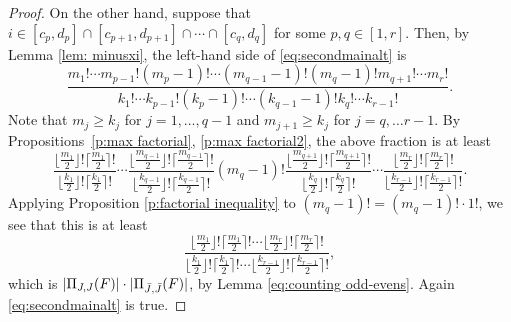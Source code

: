 \documentclass[12pt]{amsart}
\theoremstyle{definition}
\numberwithin{equation}{section}
\begin{document}
\begin{proof}
On the other hand, suppose that $i \in [c_p,d_p] \cap [c_{p+1},d_{p+1}] \cap \cdots \cap [c_q,d_q]$ for some $p ,q \in [1,r]$. Then, by Lemma \ref{lem: minusxi}, the left-hand side of \eqref{eq:secondmainalt} is \begin{equation*}
     \frac{m_1! \cdots m_{p-1}! (m_{p} -1)! \cdots (m_{q-1}-1)! (m_q -1)! m_{q+1}! \cdots m_r!}{k_1! \cdots k_{p-1}! (k_p -1)! \cdots (k_{q-1} -1)! k_q! \cdots k_{r-1}!}.
\end{equation*}
Note that $m_{j} \geq k_{j}$ for $j=1, \dotsc, q-1$ and $m_{j+1} \geq k_{j}$ for $j=q, \dotsc r-1$. By Propositions~\ref{p:max factorial}, \ref{p:max factorial2}, the above fraction is at least
\begin{equation*}
    \frac{\lfloor \frac{m_1}{2}\rfloor!\lceil \frac{m_1}{2}\rceil!}{\lfloor \frac{k_1}{2}\rfloor!\lceil \frac{k_1}{2}\rceil!} \cdots
    \frac{\lfloor \frac{m_{q-1}}{2}\rfloor!\lceil \frac{m_{q-1}}{2}\rceil!}{\lfloor \frac{k_{q-1}}{2}\rfloor!\lceil \frac{k_{q-1}}{2}\rceil!} (m_q -1)!
    \frac{\lfloor \frac{m_{q+1}}{2}\rfloor!\lceil \frac{m_{q+1}}{2}\rceil!}{\lfloor \frac{k_{q}}{2}\rfloor!\lceil \frac{k_{q}}{2}\rceil!} \cdots
    \frac{\lfloor \frac{m_{r}}{2}\rfloor!\lceil \frac{m_{r}}{2}\rceil!}{\lfloor \frac{k_{r-1}}{2}\rfloor!\lceil \frac{k_{r-1}}{2}\rceil!}.
\end{equation*}
Applying Proposition \ref{p:factorial inequality} to $(m_q-1)! = (m_q-1)! \cdot 1!$, we see that
this is at least
\begin{equation*}
    \frac{\lfloor \frac{m_1}{2}\rfloor!\lceil \frac{m_1}{2}\rceil!\cdots \lfloor \frac{m_{r}}{2}\rfloor!\lceil\frac{m_{r}}{2}\rceil!}{\lfloor \frac{k_1}{2}\rfloor!\lceil \frac{k_1}{2}\rceil!\cdots \lfloor \frac{k_{r-1}}{2}\rfloor!\lceil\frac{k_{r-1}}{2}\rceil!},
\end{equation*}which is $|\Pi_{J,J}(F)| \cdot| \Pi_{\Bar J,\Bar J}(F) |$, by Lemma \ref{eq:counting odd-evens}. Again \eqref{eq:secondmainalt} is true.
\end{proof}
\end{document}
